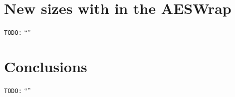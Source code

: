 \documentclass[10pt,a4paper,twoside]{llncs}
\newcommand{\todo}[1]{\texttt{\color{red}TODO:} ``\emph{#1}''}
\begin{document}
\section{New sizes with in the AESWrap \cite{rfc3394}}\label{sec:aeswrap}
\todo{}

\section{Conclusions}\label{sec:conclusion}
\todo{}



\end{document}
